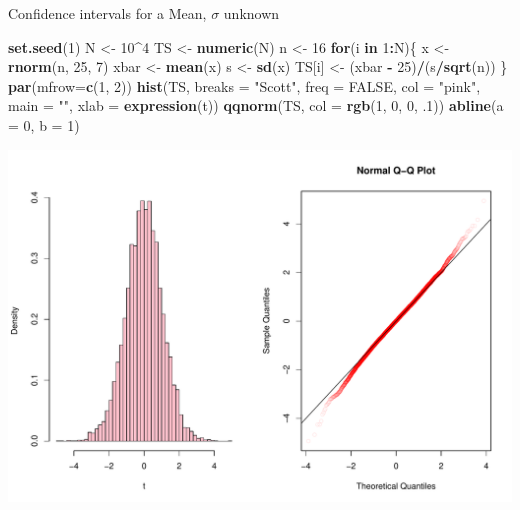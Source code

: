 \documentclass[
  ignorenonframetext,
]{beamer}
\newenvironment{Shaded}{\begin{snugshade}}{\end{snugshade}}
\newcommand{\AttributeTok}[1]{\textcolor[rgb]{0.13,0.29,0.53}{#1}}
\newcommand{\ConstantTok}[1]{\textcolor[rgb]{0.56,0.35,0.01}{#1}}
\newcommand{\ControlFlowTok}[1]{\textcolor[rgb]{0.13,0.29,0.53}{\textbf{#1}}}
\newcommand{\DecValTok}[1]{\textcolor[rgb]{0.00,0.00,0.81}{#1}}
\newcommand{\FunctionTok}[1]{\textcolor[rgb]{0.13,0.29,0.53}{\textbf{#1}}}
\newcommand{\NormalTok}[1]{#1}
\newcommand{\OtherTok}[1]{\textcolor[rgb]{0.56,0.35,0.01}{#1}}
\newcommand{\SpecialCharTok}[1]{\textcolor[rgb]{0.81,0.36,0.00}{\textbf{#1}}}
\newcommand{\StringTok}[1]{\textcolor[rgb]{0.31,0.60,0.02}{#1}}
\begin{document}
\begin{frame}[fragile]{Confidence intervals for a Mean, \(\sigma\)
unknown}
\protect\hypertarget{confidence-intervals-for-a-mean-sigma-unknown-1}{}
\tiny

\begin{Shaded}
\begin{Highlighting}[]
\FunctionTok{set.seed}\NormalTok{(}\DecValTok{1}\NormalTok{)}
\NormalTok{N }\OtherTok{\textless{}{-}} \DecValTok{10}\SpecialCharTok{\^{}}\DecValTok{4}
\NormalTok{TS }\OtherTok{\textless{}{-}} \FunctionTok{numeric}\NormalTok{(N)}
\NormalTok{n }\OtherTok{\textless{}{-}} \DecValTok{16}
\ControlFlowTok{for}\NormalTok{(i }\ControlFlowTok{in} \DecValTok{1}\SpecialCharTok{:}\NormalTok{N)\{}
\NormalTok{  x }\OtherTok{\textless{}{-}} \FunctionTok{rnorm}\NormalTok{(n, }\DecValTok{25}\NormalTok{, }\DecValTok{7}\NormalTok{)}
\NormalTok{  xbar }\OtherTok{\textless{}{-}} \FunctionTok{mean}\NormalTok{(x)}
\NormalTok{  s }\OtherTok{\textless{}{-}} \FunctionTok{sd}\NormalTok{(x)}
\NormalTok{  TS[i] }\OtherTok{\textless{}{-}}\NormalTok{ (xbar }\SpecialCharTok{{-}} \DecValTok{25}\NormalTok{)}\SpecialCharTok{/}\NormalTok{(s}\SpecialCharTok{/}\FunctionTok{sqrt}\NormalTok{(n))}
\NormalTok{\}}
\FunctionTok{par}\NormalTok{(}\AttributeTok{mfrow=}\FunctionTok{c}\NormalTok{(}\DecValTok{1}\NormalTok{, }\DecValTok{2}\NormalTok{))}
\FunctionTok{hist}\NormalTok{(TS, }\AttributeTok{breaks =} \StringTok{"Scott"}\NormalTok{, }\AttributeTok{freq =} \ConstantTok{FALSE}\NormalTok{, }\AttributeTok{col =} \StringTok{"pink"}\NormalTok{, }\AttributeTok{main =} \StringTok{""}\NormalTok{, }\AttributeTok{xlab =} \FunctionTok{expression}\NormalTok{(t))}
\FunctionTok{qqnorm}\NormalTok{(TS, }\AttributeTok{col =} \FunctionTok{rgb}\NormalTok{(}\DecValTok{1}\NormalTok{, }\DecValTok{0}\NormalTok{, }\DecValTok{0}\NormalTok{, .}\DecValTok{1}\NormalTok{))}
\FunctionTok{abline}\NormalTok{(}\AttributeTok{a =} \DecValTok{0}\NormalTok{, }\AttributeTok{b =} \DecValTok{1}\NormalTok{)}
\end{Highlighting}
\end{Shaded}

\begin{center}\includegraphics[width=0.6\linewidth,height=0.4\textheight]{Week10A_files/figure-beamer/unnamed-chunk-52-1} \end{center}
\normalsize
\end{frame}
\end{document}
